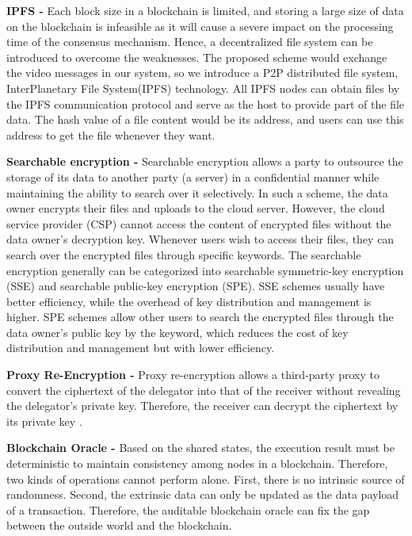 \documentclass[journal,10pt]{IEEEtran}
\begin{document}
\textbf{IPFS -}  
Each block size in a blockchain is limited, and storing a large size of data on the blockchain is infeasible as it will cause a severe impact on the processing time of the consensus mechanism. Hence, a decentralized file system can be introduced to overcome the weaknesses. The proposed scheme would exchange the video messages in our system, so we introduce a P2P distributed file system, InterPlanetary File System(IPFS) technology. All IPFS nodes can obtain files by the IPFS communication protocol and serve as the host to provide part of the file data. The hash value of a file content would be its address, and users can use this address to get the file whenever they want.

\textbf{Searchable encryption -} 
Searchable encryption allows a party to outsource the storage of its data to another party (a server) in a confidential manner while maintaining the ability to search over it selectively. In such a scheme, the data owner encrypts their files and uploads to the cloud server. However, the cloud service provider (CSP) cannot access the content of encrypted files without the data owner's decryption key. Whenever users wish to access their files, they can search over the encrypted files through specific keywords. The searchable encryption generally can be categorized into searchable symmetric-key encryption (SSE) and searchable public-key encryption (SPE). SSE schemes usually have better efficiency, while the overhead of key distribution and management is higher. SPE schemes allow other users to search the encrypted files through the data owner's public key by the keyword, which reduces the cost of key distribution and management but with lower efficiency.

\textbf{Proxy Re-Encryption -}
Proxy re-encryption allows a third-party proxy to convert the ciphertext of the delegator into that of the receiver without revealing the delegator's private key. Therefore, the receiver can decrypt the ciphertext by its private key \cite{Proxy re-encryption with keyword search}. 


\textbf{Blockchain Oracle -}
Based on the shared states, the execution result must be deterministic to maintain consistency among nodes in a blockchain. Therefore, two kinds of operations cannot perform alone. First, there is no intrinsic source of randomness. Second, the extrinsic data can only be updated as the data payload of a transaction. Therefore, the auditable blockchain oracle can fix the gap between the outside world and the blockchain.
\end{document}
